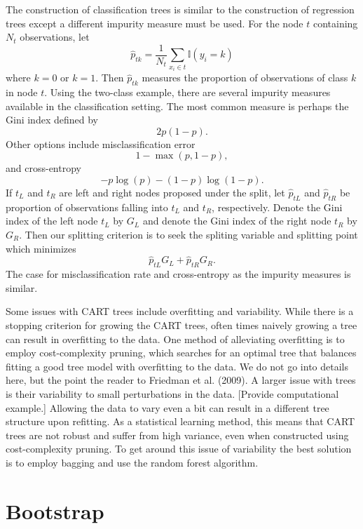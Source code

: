 \documentclass[12pt,twoside]{reedthesis}
\theoremstyle{definition}
\theoremstyle{definition}
\theoremstyle{definition}
\theoremstyle{remark}
\begin{document}
The construction of classification trees is similar to the construction
of regression trees except a different impurity measure must be used.
For the node \(t\) containing \(N_t\) observations, let
\[\hat{p}_{tk}=\frac{1}{N_t}\sum_{x_i\in t} \mathbb{I}(y_i=k)\] where
\(k=0\) or \(k=1\). Then \(\hat{p}_{tk}\) measures the proportion of
observations of class \(k\) in node \(t\). Using the two-class example,
there are several impurity measures available in the classification
setting. The most common measure is perhaps the Gini index defined by
\[2p(1-p).\] Other options include misclassification error
\[1-\max(p,1-p),\] and cross-entropy \[-p\log(p)-(1-p)\log(1-p).\] If
\(t_L\) and \(t_R\) are left and right nodes proposed under the split,
let \(\hat{p}_{tL}\) and \(\hat{p}_{tR}\) be proportion of observations
falling into \(t_L\) and \(t_R\), respectively. Denote the Gini index of
the left node \(t_L\) by \(G_{L}\) and denote the Gini index of the
right node \(t_R\) by \(G_{R}\). Then our splitting criterion is to seek
the spliting variable and splitting point which minimizes
\[\hat{p}_{tL}G_L+\hat{p}_{tR}G_R.\] The case for misclassification rate
and cross-entropy as the impurity measures is similar.

Some issues with CART trees include overfitting and variability. While
there is a stopping criterion for growing the CART trees, often times
naively growing a tree can result in overfitting to the data. One method
of alleviating overfitting is to employ cost-complexity pruning, which
searches for an optimal tree that balances fitting a good tree model
with overfitting to the data. We do not go into details here, but the
point the reader to Friedman et al. (2009). A larger issue with trees is
their variability to small perturbations in the data. {[}Provide
computational example.{]} Allowing the data to vary even a bit can
result in a different tree structure upon refitting. As a statistical
learning method, this means that CART trees are not robust and suffer
from high variance, even when constructed using cost-complexity pruning.
To get around this issue of variability the best solution is to employ
bagging and use the random forest algorithm.

\section{Bootstrap}\label{bootstrap}
\end{document}
